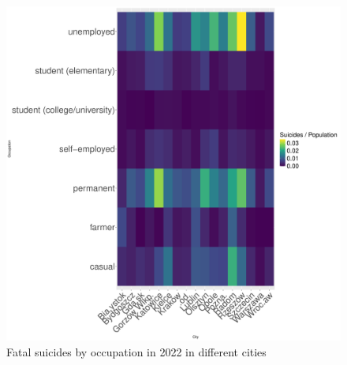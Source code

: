 \documentclass{article}
\begin{document}
\begin{figure}[H]
\begin{minipage}{0.65\textwidth}
        \includegraphics[width=\textwidth]{imgs/job_city_op-fat-2022.pdf}
        \caption{Fatal suicides by occupation in 2022 in different cities}
	\label{fig:job_city_op-fat-2022}
    \end{minipage}
\end{figure}



%
%
%
\end{document}
